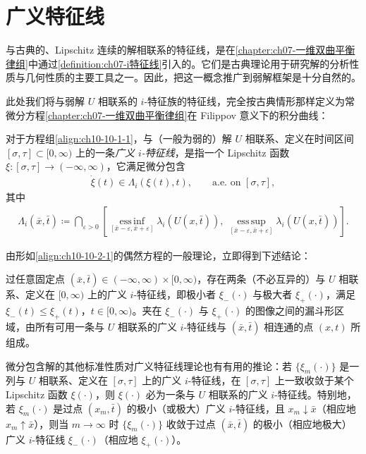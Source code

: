 \documentclass[../../main.tex]{subfiles}
\begin{document}
\section{广义特征线}\label{section:ch10-广义特征线}

与古典的、Lipschitz 连续的解相联系的特征线，是在\cref{chapter:ch07-一维双曲平衡律组}中通过\cref{definition:ch07-i特征线}引入的。它们是古典理论用于研究解的分析性质与几何性质的主要工具之一。因此，把这一概念推广到弱解框架是十分自然的。


此处我们将与弱解 $U$ 相联系的 $i$-特征族的特征线，完全按古典情形那样定义为常微分方程\cref{chapter:ch07-一维双曲平衡律组}在 Filippov 意义下的积分曲线：


\begin{definition}[广义 $i$-特征线]\label{definition:ch10-广义i特征线}
对于方程组\eqref{align:ch10-10-1-1}，与（一般为弱的）解 $U$ 相联系、定义在时间区间 $[\sigma,\tau]\subset[0,\infty)$ 上的一条\emph{广义 $i$-特征线}，是指一个 Lipschitz 函数 $\xi:[\sigma,\tau]\to(-\infty,\infty)$，它满足微分包含
\begin{align}
\dot{\xi}(t)\in\Lambda_{i}(\xi(t),t),\qquad\text{a.e. on }[\sigma,\tau],
\label{align:ch10-10-2-1}
\end{align}
其中
\begin{align}
\Lambda_{i}(\bar{x},\bar{t})\coloneqq\bigcap_{\varepsilon>0}\left[\operatorname*{ess\,inf}_{[\bar{x}-\varepsilon,\bar{x}+\varepsilon]}\lambda_{i}(U(x,\bar{t})),\ \operatorname*{ess\,sup}_{[\bar{x}-\varepsilon,\bar{x}+\varepsilon]}\lambda_{i}(U(x,\bar{t}))\right].
\label{align:ch10-10-2-2}
\end{align}
\end{definition}

由形如\eqref{align:ch10-10-2-1}的偶然方程的一般理论，立即得到下述结论：

\begin{theorem}\label{theorem:ch10-过点两条广义特征线}
过任意固定点 $(\bar{x},\bar{t})\in(-\infty,\infty)\times[0,\infty)$，存在两条（不必互异的）与 $U$ 相联系、定义在 $[0,\infty)$ 上的广义 $i$-特征线，即极小者 $\xi_{-}(\cdot)$ 与极大者 $\xi_{+}(\cdot)$，满足 $\xi_{-}(t)\leqslant\xi_{+}(t)$，$t\in[0,\infty)$。夹在 $\xi_{-}(\cdot)$ 与 $\xi_{+}(\cdot)$ 的图像之间的漏斗形区域，由所有可用一条与 $U$ 相联系的广义 $i$-特征线与 $(\bar{x},\bar{t})$ 相连通的点 $(x,t)$ 所组成。
\end{theorem}

微分包含解的其他标准性质对广义特征线理论也有有用的推论：若 $\{\xi_{m}(\cdot)\}$ 是一列与 $U$ 相联系、定义在 $[\sigma,\tau]$ 上的广义 $i$-特征线，在 $[\sigma,\tau]$ 上一致收敛于某个 Lipschitz 函数 $\xi(\cdot)$，则 $\xi(\cdot)$ 必为一条与 $U$ 相联系的广义 $i$-特征线。特别地，若 $\xi_{m}(\cdot)$ 是过点 $(x_{m},\bar{t})$ 的极小（或极大）广义 $i$-特征线，且 $x_{m}\downarrow\bar{x}$（相应地 $x_{m}\uparrow\bar{x}$），则当 $m\to\infty$ 时 $\{\xi_{m}(\cdot)\}$ 收敛于过点 $(\bar{x},\bar{t})$ 的极小（相应地极大）广义 $i$-特征线 $\xi_{-}(\cdot)$（相应地 $\xi_{+}(\cdot)$）。
\end{document}
